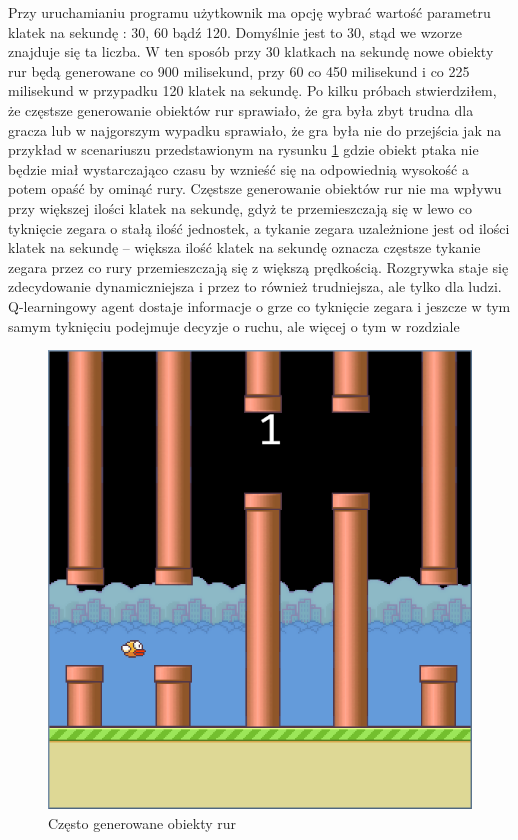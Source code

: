 \documentclass[a4paper,12pt,oneside]{book}
\begin{document}
Przy uruchamianiu programu użytkownik ma opcję wybrać wartość parametru 
klatek na sekundę : 30, 60 bądź 120. Domyślnie jest to 30, stąd we wzorze
znajduje się ta liczba. W ten sposób przy 30 klatkach na sekundę nowe obiekty
rur będą generowane co 900 milisekund, przy 60 co 450 milisekund i co 225
milisekund w przypadku 120 klatek na sekundę. Po kilku próbach stwierdziłem,
że częstsze generowanie obiektów rur sprawiało, że gra była zbyt trudna dla
gracza lub w najgorszym wypadku sprawiało, że gra była nie do przejścia
jak na przykład w scenariuszu przedstawionym na rysunku \ref{frequent_pipes}
gdzie obiekt ptaka nie będzie miał wystarczająco czasu by wznieść się na 
odpowiednią wysokość a potem opaść by ominąć rury. Częstsze generowanie 
obiektów rur nie ma wpływu przy większej ilości klatek na sekundę, gdyż te
przemieszczają się w lewo co tyknięcie zegara o stałą ilość jednostek, a
tykanie zegara uzależnione jest od ilości klatek na sekundę -- większa ilość
klatek na sekundę oznacza częstsze tykanie zegara przez co rury przemieszczają
się z większą prędkością. Rozgrywka staje się zdecydowanie dynamiczniejsza
i przez to również trudniejsza, ale tylko dla ludzi. Q-learningowy agent
dostaje informacje o grze co tyknięcie zegara i jeszcze w tym samym tyknięciu
podejmuje decyzje o ruchu, ale więcej o tym w rozdziale
\begin{figure}
	\begin{center}
		\includegraphics[scale=0.50]{impossible_pipes.png}
		\caption{Często generowane obiekty rur}
		\label{frequent_pipes}
	\end{center}
\end{figure}
\end{document}
